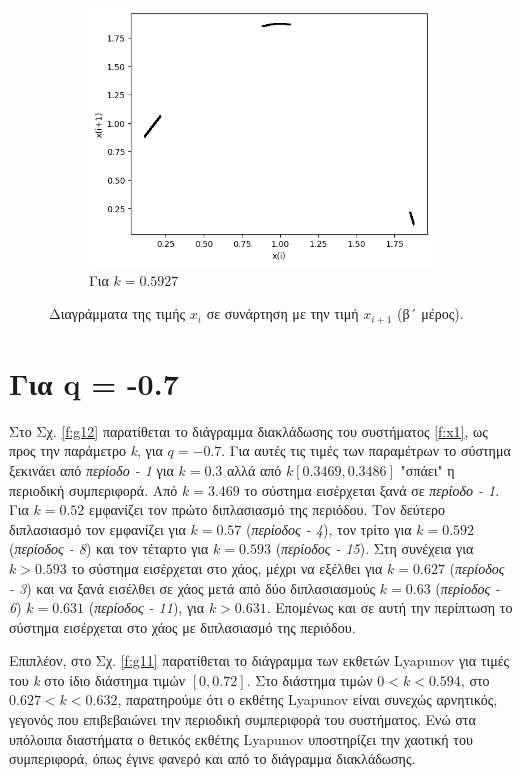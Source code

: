 \begin{figure}[ht]
\begin{subfigure}[b]{0.4\textwidth}
		\includegraphics[width=\textwidth]{LateX images/graphs q05/g11}
		\caption{Για $k=0.5927$}
		\label{f:k36}
	\end{subfigure}
	\hfill
	\caption{Διαγράμματα της τιμής \(x_i\) σε συνάρτηση με την τιμή \(x_{i+1}\) (β´ μέρος).}		
\end{figure}

\clearpage

\section{Για q = -0.7}

Στο Σχ. \ref{f:g12} παρατίθεται το διάγραμμα διακλάδωσης του συστήματος \ref{f:x1}, ως προς την παράμετρο \emph{k}, για $q =- 0.7$. Για αυτές τις τιμές των παραμέτρων το σύστημα ξεκινάει από \emph{περίοδο - 1} για $k=0.3$ αλλά από $k[0.3469,0.3486]$ "σπάει" η περιοδική συμπεριφορά. Από $k=3.469$ το σύστημα εισέρχεται ξανά σε \emph{περίοδο - 1}. Για  $k = 0.52$ εμφανίζει τον πρώτο διπλασιασμό της περιόδου. Τον δεύτερο διπλασιασμό τον εμφανίζει για $k=0.57$  (\emph{περίοδος - 4}), τον τρίτο για $k=0.592$ (\emph{περίοδος - 8}) και τον τέταρτο για $k=0.593$ (\emph{περίοδος - 15}). Στη συνέχεια για $k>0.593$ το σύστημα εισέρχεται στο χάος, μέχρι να εξέλθει  για $k=0.627$ (\emph{περίοδος -   3}) και να ξανά εισέλθει σε χάος μετά από δύο διπλασιασμούς $k=0.63$  (\emph{περίοδος - 6}) $k=0.631$ (\emph{περίοδος -   11}), για $k>0.631$.
Επομένως και σε αυτή την περίπτωση το σύστημα εισέρχεται στο χάος με διπλασιασμό της περιόδου. 

Επιπλέον, στο Σχ. \ref{f:g11} παρατίθεται το διάγραμμα των εκθετών Lyapunov για τιμές του \emph{k} στο ίδιο διάστημα τιμών $[0, 0.72]$. Στο διάστημα τιμών $0<k<0.594$, στο $0.627<k<0.632$, παρατηρούμε ότι ο εκθέτης Lyapunov είναι συνεχώς αρνητικός, γεγονός που επιβεβαιώνει την περιοδική συμπεριφορά του συστήματος. Ενώ στα υπόλοιπα διαστήματα ο θετικός εκθέτης Lyapunov υποστηρίζει την χαοτική του συμπεριφορά, όπως έγινε φανερό και από το διάγραμμα διακλάδωσης.

